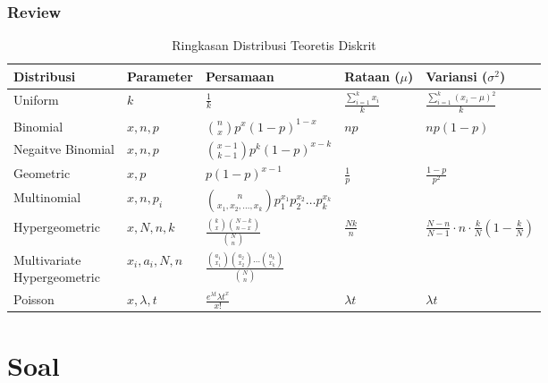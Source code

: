 \documentclass[]{beamer}
\begin{document}
\begin{frame}
	\frametitle{Review}
	\begin{table}
    \tiny
		\begin{tabular}{l | l | l | l | l}
			\toprule
			\textbf{Distribusi} & \textbf{Parameter} & \textbf{Persamaan} & \textbf{Rataan ($\mu$)} & \textbf{Variansi ($\sigma^2$)} \\
			\midrule
			Uniform & $k$ & $\frac{1}{k}$ & $ \frac{\sum_{i=1}^{k} x_{i}}{k}$ & $\frac{\sum_{i=1}^{k} (x_{i} - \mu)^2}{k}$ \\
            \hline
			Binomial & $x, n, p$ & $\binom{n}{x} p^x(1-p)^{1-x}$ & $np$ & $np(1-p)$\\
            \hline
			Negaitve Binomial & $x, n, p$ & $\binom{x-1}{k-1}p^k(1-p)^{x-k}$ \\
            \hline
            Geometric & $x, p$ & $p(1-p)^{x-1}$ & $\frac{1}{p}$ & $\frac{1-p}{p^2}$\\
            \hline
            Multinomial & $x,n,p_i$ & $\binom{n}{x_1,x_2,\dots,x_k}p_1^{x_1}p_2^{x_2}\dots p_k^{x_k}$\\
            \hline
            Hypergeometric & $x, N, n, k$ & $\frac{\binom{k}{x}\binom{N-k}{n-x}}{\binom{N}{n}}$ & $\frac{Nk}{n}$ &$ \frac{N-n}{N-1}\cdot n\cdot \frac{k}{N}(1-\frac{k}{N})$\\
            \hline
            \makecell[l]{Multivariate \\ Hypergeometric} \ & $x_i, a_i, N, n$ & $\frac{\binom{a_1}{x_1}\binom{a_2}{x_2}\dots \binom{a_k}{x_k}}{\binom{N}{n}}$ \\
            \hline
            Poisson & $x,\lambda,t$ & $\frac{e^{\lambda t}{\lambda t}^x}{x!}$ & $\lambda t$ & $\lambda t$\\
			\bottomrule
		\end{tabular}
		\caption{Ringkasan Distribusi Teoretis Diskrit}
	\end{table}
\end{frame}

\section{Soal}
\end{document}
